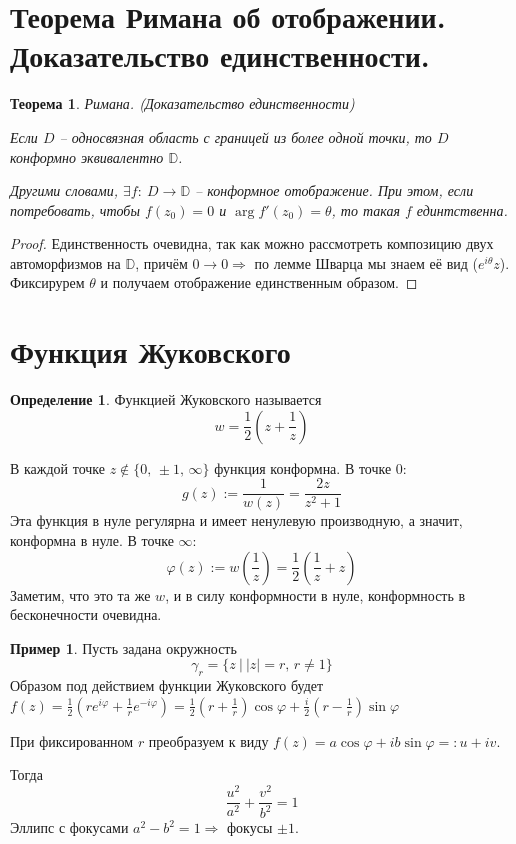 \documentclass[a4paper,12pt]{article}
\renewcommand{\phi}{\ensuremath{\varphi}}
\theoremstyle{plain}
\newtheorem{theorem}{Теорема}[section]
\theoremstyle{definition}
\newtheorem{definition}{Определение}[section]
\newtheorem*{example}{Пример}
\theoremstyle{remark}
\begin{document}
\section{Теорема Римана об отображении. Доказательство единственности.}
\begin{theorem}
	Римана. (Доказательство единственности)

	Если $D$ -- односвязная область с границей из более одной точки, то $D$ конформно эквивалентно $\mathbb{D}$. 

	Другими словами, $\exists f :\: D \to \mathbb{D}$ -- конформное отображение. При этом, если потребовать, чтобы $f(z_0) = 0$ и $\arg f'(z_0) = \theta$, то такая $f$ единтственна. 
\end{theorem}

\begin{proof}
	Единственность очевидна, так как можно рассмотреть композицию двух  автоморфизмов на $\mathbb{D}$, причём $0 \to 0 \Rightarrow$ по лемме Шварца мы знаем её вид ($e^{i\theta}z$). Фиксирурем $\theta$ и получаем отображение единственным образом.
\end{proof}

\section{Функция Жуковского}
\begin{definition}
	Функцией Жуковского называется
	\[
		w = \frac{1}{2}\left(z + \frac{1}{z}\right)
	\]
\end{definition}

В каждой точке $z \not\in \{0,\, \pm 1,\, \infty\}$ функция конформна. В точке $0$:
\[
	g(z) := \frac{1}{w(z)} = \frac{2z}{z^2 + 1}
\]
Эта функция в нуле регулярна и имеет ненулевую производную, а значит, конформна в нуле. В точке $\infty$:
\[
	\phi(z) := w\left(\frac{1}{z}\right) = \frac{1}{2}\left(\frac{1}{z} + z\right)
\]
Заметим, что это та же $w$, и в силу конформности в нуле, конформность в бесконечности очевидна.

\begin{example}
	Пусть задана окружность
	\[
		\gamma_r = \{z \:\vert\: \vert z\vert = r,\, r \neq 1\}
	\]
	Образом под действием функции Жуковского будет $f(z) = \frac{1}{2}\left(re^{i\phi} + \frac{1}{r}e^{-i\phi}\right) = \frac{1}{2}\left(r + \frac{1}{r}\right)\cos\phi + \frac{i}{2}\left(r - \frac{1}{r}\right)\sin\phi$

	При фиксированном $r$ преобразуем к виду $f(z) = a\cos\phi + ib\sin\phi =: u + iv$.

	Тогда
	\[
		\frac{u^2}{a^2} + \frac{v^2}{b^2} = 1
	\]
	Эллипс с фокусами $a^2 - b^2 = 1 \Rightarrow$ фокусы $\pm1$.
\end{example}
\end{document}
